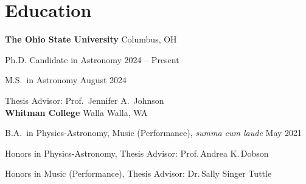 \section*{Education}

\noindent
{\bf The Ohio State University} 
\hfill Columbus, OH

Ph.D. Candidate in Astronomy
\hfill 2024 -- Present

M.S.\ in Astronomy
\hfill August 2024 

Thesis Advisor: Prof.\ Jennifer A.\ Johnson \\

\vspace{-6pt}
\noindent
{\bf Whitman College} 
\hfill Walla Walla, WA

B.A.\ in Physics-Astronomy, Music (Performance), {\it summa cum laude}
\hfill May 2021

Honors in Physics-Astronomy, Thesis Advisor: Prof.\,Andrea K.\,Dobson


Honors in Music (Performance), Thesis Advisor: Dr.\,Sally Singer Tuttle
